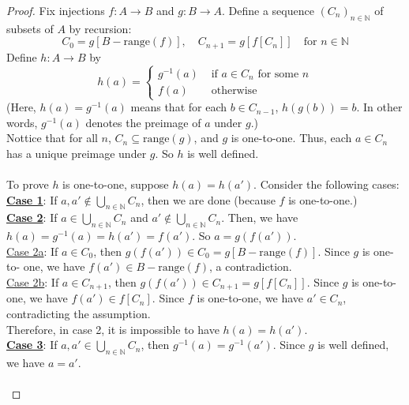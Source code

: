 \documentclass[14pt]{article}
\theoremstyle{definition}
\newcommand{\fun}[3]{#1\colon #2\rightarrow#3}
\newcommand{\bb}[1]{\mathbb{#1}}
\begin{document}
\begin{proof}
    Fix injections $\fun{f}{A}{B}$ and $\fun{g}{B}{A}$. Define a sequence $(C_n)_{n\in\bb{N}}$
    of subsets of $A$ by recursion:
    \begin{equation*}
        C_0=g[B-\mathrm{range}(f)], \quad C_{n+1}=g[f[C_n]] \quad\text{for } n\in\bb{N}
    \end{equation*}
    Define $\fun{h}{A}{B}$ by 
    \begin{equation*}
        h(a)=\begin{cases}
            g^{-1}(a) & \text{ if }a\in C_n \text{ for some }n\\
            f(a)    &  \text{ otherwise}
        \end{cases}
    \end{equation*}
    (Here, $h(a)=g^{-1}(a)$ means that for each $b\in C_{n-1}$,
    $h(g(b))=b$. In other words, $g^{-1}(a)$ denotes the preimage of $a$ under $g$.)\\
    Nottice that for all $n$, $C_n\subseteq \mathrm{range}(g)$, and $g$ is one-to-one. 
    Thus, each $a\in C_n$ has a unique preimage under $g$. So $h$ is well defined.\\\\
    To prove $h$ is one-to-one, suppose $h(a)=h(a')$. Consider the following cases:\\
    \textbf{\underline{Case 1}}: If $a, a'\not\in \bigcup_{n\in\bb{N}} C_n$, then we are done
    (because $f$ is one-to-one.)\\
    \textbf{\underline{Case 2}}: If $a\in \bigcup_{n\in\bb{N}} C_n$ and $a'\not\in \bigcup_{n\in\bb{N}} C_n$.
    Then, we have $h(a)=g^{-1}(a)=h(a')=f(a')$. So $a=g(f(a'))$.\\
    \underline{Case 2a}: If $a\in C_0$, then $g(f(a'))\in C_0=g[B-\mathrm{range}(f)]$.
    Since $g$ is one-to-
    one, we have $f(a')\in B-\mathrm{range}(f) $, a contradiction.\\
    \underline{Case 2b}: If $a\in C_{n+1}$, then $g(f(a'))\in C_{n+1}=g[f[C_n]]$.
    Since $g$ is one-to-one, we have $f(a')\in f[C_n]$. Since $f$ is one-to-one, we have 
    $a'\in C_n$, contradicting the assumption.\\
    Therefore, in case 2, it is impossible to have $h(a)=h(a')$.\\
    \textbf{\underline{Case 3}}: If $a, a'\in \bigcup_{n\in\bb{N}} C_n$, then $g^{-1}(a)=
    g^{-1}(a')$. Since $g$ is well defined, we have $a=a'$.\\\\

\end{proof}
\end{document}
